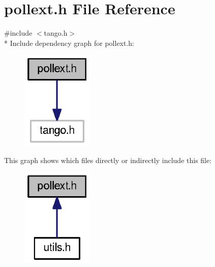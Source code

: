 \section{pollext.\-h File Reference}
\label{pollext_8h}
{\ttfamily \#include $<$tango.\-h$>$}\\*
Include dependency graph for pollext.\-h\-:
\nopagebreak
\begin{figure}[H]
\begin{center}
\leavevmode
\includegraphics[width=96pt]{dd/d78/pollext_8h__incl}
\end{center}
\end{figure}
This graph shows which files directly or indirectly include this file\-:
\nopagebreak
\begin{figure}[H]
\begin{center}
\leavevmode
\includegraphics[width=96pt]{d1/dc1/pollext_8h__dep__incl}
\end{center}
\end{figure}

